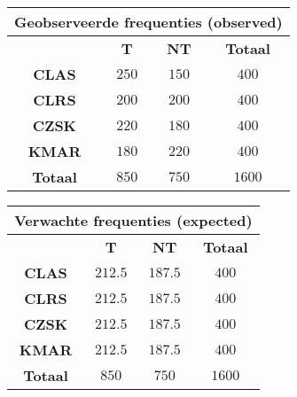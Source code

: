 \begin{question}{30}
{        \begin{minipage}{0.45\textwidth}
            \begin{table}[H]
                \centering
                \begin{tabular}{c|cc|c}
                    \multicolumn{4}{c}{\textbf{Geobserveerde frequenties (observed)}} \\
                    \toprule
                        & \textbf{T} & \textbf{NT}  & \textbf{Totaal} \\
                    \midrule
                        \textbf{CLAS} & $250$ & $150$ & $400$ \\ 
                        \textbf{CLRS} & $200$ & $200$ & $400$ \\ 
                        \textbf{CZSK} & $220$ & $180$ & $400$ \\ 
                        \textbf{KMAR} & $180$ & $220$ & $400$ \\ 
                    \midrule
                        \textbf{Totaal} & $850$ & $750$ & $1600$ \\
                    \bottomrule
                \end{tabular}
            \end{table}
        \end{minipage}
        \hfill
        \begin{minipage}{0.45\textwidth}
            \begin{table}[H]
                \centering
                \begin{tabular}{c|cc|c}
                    \multicolumn{4}{c}{\textbf{Verwachte frequenties (expected)}} \\
                    \toprule
                        & \textbf{T}  & \textbf{NT}  & \textbf{Totaal} \\
                    \midrule
    			        \textbf{CLAS} & $212.5$ & $187.5$ & $400$ \\ 
                        \textbf{CLRS} & $212.5$ & $187.5$ & $400$ \\ 
                        \textbf{CZSK} & $212.5$ & $187.5$ & $400$ \\ 
                        \textbf{KMAR} & $212.5$ & $187.5$ & $400$ \\ 
                    \midrule
                        \textbf{Totaal} & $850$ & $750$ & $1600$ \\
                    \bottomrule
                \end{tabular}
            \end{table}
        \end{minipage}
        
}
\end{question}
